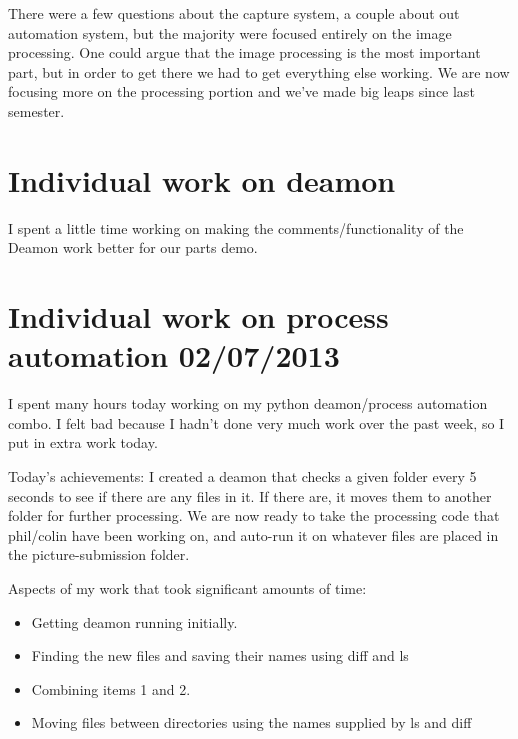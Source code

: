 \documentclass[]{article}
\begin{document}
	There were a few questions about the capture system, a couple about out automation system, but the majority were focused entirely on the image processing. One could argue that the image processing is the most important part, but in order to get there we had to get everything else working. We are now focusing more on the processing portion and we've made big leaps since last semester. 	
	\section{Individual work on deamon}
	
	I spent a little time working on making the comments/functionality of the Deamon work better for our parts demo. 
	
	\section{Individual work on process automation 02/07/2013}
	
	I spent many hours today working on my python deamon/process automation combo. I felt bad because I hadn't done very much work over the past week, so I put in extra work today.
	
	Today's achievements: I created a deamon that checks a given folder every 5 seconds to see if there are any files in it. If there are, it moves them to another folder for further processing. We are now ready to take the processing code that phil/colin have been working on, and auto-run it on whatever files are placed in the picture-submission folder.
	
	Aspects of my work that took significant amounts of time:
	
	\begin{itemize}
					\item Getting deamon running initially.
					\item Finding the new files and saving their names using diff and ls
					\item Combining items 1 and 2.
					\item Moving files between directories using the names supplied by ls and diff
	\end{itemize}
		
\end{document}
